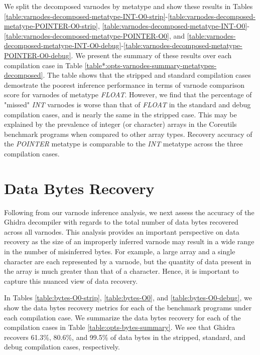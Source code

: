 We split the decomposed varnodes by metatype and show these results in Tables \ref{table:varnodes-decomposed-metatype-INT-O0-strip}-\ref{table:varnodes-decomposed-metatype-POINTER-O0-strip}, \ref{table:varnodes-decomposed-metatype-INT-O0}-\ref{table:varnodes-decomposed-metatype-POINTER-O0}, and \ref{table:varnodes-decomposed-metatype-INT-O0-debug}-\ref{table:varnodes-decomposed-metatype-POINTER-O0-debug}. We present the summary of these results over each compilation case in Table \ref{table*:opts-varnodes-summary-metatypes-decomposed}. The table shows that the stripped and standard compilation cases demostrate the poorest inference performance in terms of varnode comparison score for varnodes of metatype \emph{FLOAT}. However, we find that the percentage of "missed" \emph{INT} varnodes is worse than that of \emph{FLOAT} in the standard and debug compilation cases, and is nearly the same in the stripped case. This may be explained by the prevalence of integer (or character) arrays in the Coreutils benchmark programs when compared to other array types. Recovery accuracy of the \emph{POINTER} metatype is comparable to the \emph{INT} metatype across the three compilation cases.

\section{Data Bytes Recovery}

Following from our varnode inference analysis, we next assess the accuracy of the Ghidra decompiler with regards to the total number of data bytes recovered across all varnodes. This analysis provides an important perspective on data recovery as the size of an improperly inferred varnode may result in a wide range in the number of misinferred bytes. For example, a large array and a single character are each represented by a varnode, but the quantity of data present in the array is much greater than that of a character. Hence, it is important to capture this nuanced view of data recovery.



In Tables \ref{table:bytes-O0-strip}, \ref{table:bytes-O0}, and \ref{table:bytes-O0-debug}, we show the data bytes recovery metrics for each of the benchmark programs under each compilation case. We summarize the data bytes recovery for each of the compilation cases in Table \ref{table:opts-bytes-summary}. We see that Ghidra recovers 61.3\%, 80.6\%, and 99.5\% of data bytes in the stripped, standard, and debug compilation cases, respectively.


